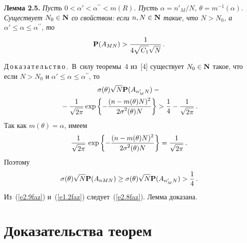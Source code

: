 \begin{multicols}{2}
\medskip

\noindent
\textbf{Лемма 2.5.} {\it Пусть $0< \alpha'< \alpha^{\prime\prime}<m(R)$. Пусть
$\alpha = n'_M/N$, $\theta=m^{-1}(\alpha)$. Существует $N_0\in{{\bf N}}$
со свойством: если $n, N\in {{\bf N}}$ такие, что $N>N_0$, а $
\alpha'\le\alpha\le \alpha^{\prime\prime}$, то
\begin{equation}
 \P(A_{MN}) > \fr{1}{4\sqrt{C_1}\sqrt{N}}\,.
\label{e2.8faz}
\end{equation}
}

\medskip

\noindent
Д\,о\,к\,а\,з\,а\,т\,е\,л\,ь\,с\,т\,в\,о\,.\ В~силу теоремы~4 из~[4] существует $N_0\in
{{\bf N}}$ такое, что если
 $N>N_0$ и $\alpha'\le\alpha\le \alpha^{\prime\prime}$, то
\begin{multline*}
 \sigma(\theta)\sqrt{N} {\bf P}(A_{n'_MN})-{}\\
{}-\displaystyle\frac{\displaystyle 1\mathstrut}{\displaystyle \sqrt{2\pi}\mathstrut}\exp\left\{-\displaystyle\frac{\displaystyle (n-m(\theta)N)^2\mathstrut}{\displaystyle 2\sigma^2(\theta)N\mathstrut}\right\}
>\displaystyle\frac{\displaystyle 1\mathstrut}{\displaystyle 4\mathstrut}-\displaystyle\frac{\displaystyle 1\mathstrut}{\displaystyle  \sqrt{2\pi}\mathstrut}\,.
\end{multline*}
Так как $m(\theta)=\alpha$, имеем
$$
\displaystyle\frac{\displaystyle 1\mathstrut}{\displaystyle \sqrt{2\pi}\mathstrut}\,\exp\left\{-\displaystyle\frac{\displaystyle (n-m(\theta)N)^2\mathstrut}{\displaystyle 2\sigma^2(\theta)N\mathstrut}\right\}=\displaystyle\frac{\displaystyle 1\mathstrut}{\displaystyle \sqrt{2\pi}\mathstrut}\,.
$$
Поэтому
\begin{equation}
\sigma(\theta)\sqrt{N} \P(A_{nMN})\ge \sigma(\theta)\sqrt{N}
\P(A_{n'_MN})
>\fr{1}{4}\,.
\label{e2.9faz}
\end{equation}
Из~(\ref{e2.9faz}) и~(\ref{e1.2faz}) следует~(\ref{e2.8faz}). Лемма доказана.

\medskip

\section{Доказательства теорем}


\end{multicols}
